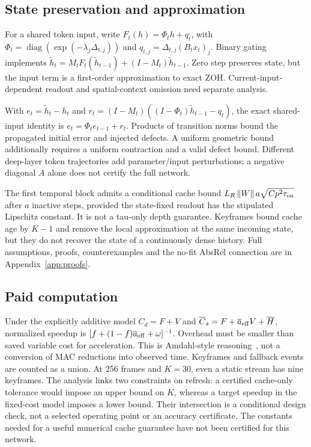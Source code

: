 \documentclass[mathematics,article,submit,moreauthors]{Definitions/mdpi}
\providecommand{\norm}[1]{\left\lVert#1\right\rVert}
\begin{document}
\subsection{State preservation and approximation}
For a shared token input, write $F_t(h)=\Phi_t h+q_t$, with
$\Phi_t=\operatorname{diag}(\exp(-\lambda_j\Delta_{t,j}))$ and
$q_{t,j}=\Delta_{t,j}(B_tx_t)_j$. Binary gating implements
$\widetilde h_t=M_tF_t(\widetilde h_{t-1})+(I-M_t)\widetilde h_{t-1}$.
Zero step preserves state, but the input term is a first-order approximation to exact
ZOH. Current-input-dependent readout and spatial-context omission need separate analysis.

With $e_t=\widetilde h_t-h_t$ and
$r_t=(I-M_t)((I-\Phi_t)\widetilde h_{t-1}-q_t)$, the exact shared-input identity is
$e_t=\Phi_te_{t-1}+r_t$. Products of transition norms bound the propagated initial
error and injected defects. A uniform geometric bound additionally requires a uniform
contraction and a valid defect bound. Different deep-layer token trajectories add
parameter/input perturbations; a negative diagonal $A$ alone does not certify the full network.

The first temporal block admits a conditional cache bound
$L_R\norm{W}a\sqrt{Cp^2\tau_{\rm on}}$ after $a$ inactive steps, provided the
state-fixed readout has the stipulated Lipschitz constant. It is not a tau-only
depth guarantee. Keyframes bound cache age by $K-1$ and remove the local approximation
at the same incoming state, but they do not recover the state of a continuously dense history.
Full assumptions, proofs, counterexamples and the no-fit AbsRel connection are in Appendix~\ref{app:proofs}.

\subsection{Paid computation}
Under the explicitly additive model $C_d=F+V$ and
$\overline C_s=F+\overline a_{\rm eff}V+\overline H$, normalized speedup is
$[f+(1-f)\overline a_{\rm eff}+\omega]^{-1}$. Overhead must be smaller than
saved variable cost for acceleration. This is Amdahl-style reasoning~\cite{amdahl1967},
not a conversion of MAC reductions into observed time. Keyframes and fallback events
are counted as a union. At 256 frames and $K=30$, even a static stream has nine keyframes.
The analysis links two constraints on refresh: a certified cache-only tolerance
would impose an upper bound on $K$, whereas a target speedup in the fixed-cost
model imposes a lower bound. Their intersection is a conditional design check,
not a selected operating point or an accuracy certificate. The constants needed
for a useful numerical cache guarantee have not been certified for this network.
\end{document}
